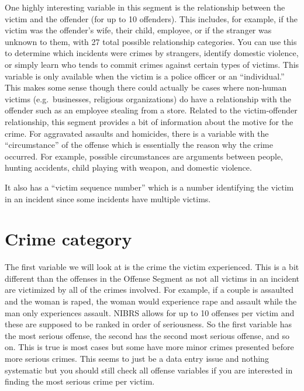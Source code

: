 \documentclass[
]{krantz}
\begin{document}
One highly interesting variable in this segment is the
relationship between the victim and the offender (for up to
10 offenders). This includes, for example, if the victim was
the offender's wife, their child, employee, or if the
stranger was unknown to them, with 27 total possible
relationship categories. You can use this to determine which
incidents were crimes by strangers, identify domestic
violence, or simply learn who tends to commit crimes against
certain types of victims. This variable is only available
when the victim is a police officer or an ``individual.''
This makes some sense though there could actually be cases
where non-human victims (e.g.~businesses, religious
organizations) do have a relationship with the offender such
as an employee stealing from a store. Related to the
victim-offender relationship, this segment provides a bit of
information about the motive for the crime. For aggravated
assaults and homicides, there is a variable with the
``circumstance'' of the offense which is essentially the
reason why the crime occurred. For example, possible
circumstances are arguments between people, hunting
accidents, child playing with weapon, and domestic violence.

It also has a ``victim sequence number'' which is a number
identifying the victim in an incident since some incidents
have multiple victims.

\section{Crime category}\label{crime-category-1}

The first variable we will look at is the crime the victim
experienced. This is a bit different than the offenses in
the Offense Segment as not all victims in an incident are
victimized by all of the crimes involved. For example, if a
couple is assaulted and the woman is raped, the woman would
experience rape and assault while the man only experiences
assault. NIBRS allows for up to 10 offenses per victim and
these are supposed to be ranked in order of seriousness. So
the first variable has the most serious offense, the second
has the second most serious offense, and so on. This is true
is most cases but some have more minor crimes presented
before more serious crimes. This seems to just be a data
entry issue and nothing systematic but you should still
check all offense variables if you are interested in finding
the most serious crime per victim.
\end{document}
